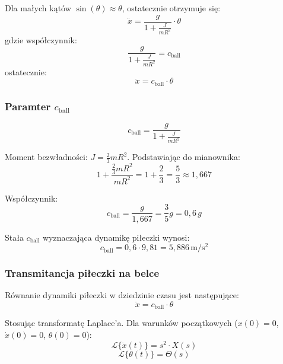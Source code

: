 Dla małych kątów $\sin(\theta) \approx \theta$, ostatecznie otrzymuje się:
\begin{equation}
\ddot{x} = \frac{g}{1 + \frac{J}{m R^2}} \cdot \theta
\end{equation}
gdzie współczynnik:
\begin{equation}
\frac{g}{1 + \frac{J}{m R^2}}=c_{\mathrm{ball}}
\end{equation}
ostatecznie:
\begin{equation}
\ddot{x}=c_{\mathrm{ball}} \cdot \theta
\end{equation}

\subsubsection{Paramter $c_{\mathrm{ball}}$}

\begin{equation}
c_{\mathrm{ball}} = \frac{g}{1 + \frac{J}{m R^2}}
\end{equation}


Moment bezwładności: $J = \frac{2}{3} m R^2$. 
Podstawiając do mianownika:
\begin{equation}
1 + \frac{\frac{2}{3} m R^2}{m R^2} = 1 + \frac{2}{3} = \frac{5}{3} \approx 1{,}667
\end{equation}

Współczynnik:
\begin{equation}
c_{\mathrm{ball}} = \frac{g}{1{,}667} = \frac{3}{5} g = 0{,}6 \, g
\end{equation}

Stała $c_{\mathrm{ball}}$ wyznaczająca dynamikę piłeczki wynosi:
\begin{equation}
c_{\mathrm{ball}} = 0{,}6 \cdot 9{,}81 = 5{,}886 \, \mathrm{m/s^2}
\end{equation}

\subsubsection{Transmitancja piłeczki na belce}

Równanie dynamiki piłeczki w dziedzinie czasu jest następujące:
\begin{equation}
\ddot{x}=c_{\mathrm{ball}} \cdot \theta
\end{equation}

Stosując transformatę Laplace'a. Dla warunków początkowych ($x(0) = 0$, $\dot{x}(0) = 0$, $\theta(0) = 0$):
\begin{equation}
\mathcal{L}\{\ddot{x}(t)\} = s^2 \cdot X(s)
\end{equation}
\begin{equation}
\mathcal{L}\{\theta(t)\} = \Theta(s)
\end{equation}

